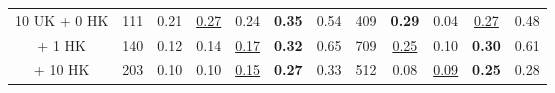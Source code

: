 \begin{table*}[!ht]
{\begin{tabular}{c|rccccc|rcccc}
\hspace{0.5ex} 10 UK + \hspace{0.5ex} 0 HK   & 111                                              & 0.21                                          & \underline{0.27}                                                                  & 0.24                                                                      & \textbf{0.35}                                                              & 0.54                                                                           & 409                                              & \textbf{0.29}                                                               & 0.04                                          & \underline{0.27}                                                                 & 0.48                                                                          \\
\hspace{7ex} + \hspace{0.5ex} 1 HK   & 140                                              & 0.12                                                                       & 0.14                                                          & \underline{0.17}                                                                & \textbf{0.32}                                                              & 0.65                                                                           & 709                        & \underline{0.25}                                                                  & 0.10                                                                      & \textbf{0.30}                                                              & 0.61                                                                          \\
\hspace{7ex} + 10 HK  & 203                                              & 0.10                                                                       & 0.10                                   & \underline{0.15}                                                                & \textbf{0.27}                                                              & 0.33                                                                           & 512                                              & 0.08                                                                        & \underline{0.09}                                                                & \textbf{0.25}                                                              & 0.28                                                                          \\

\end{tabular}}
\end{table*}

